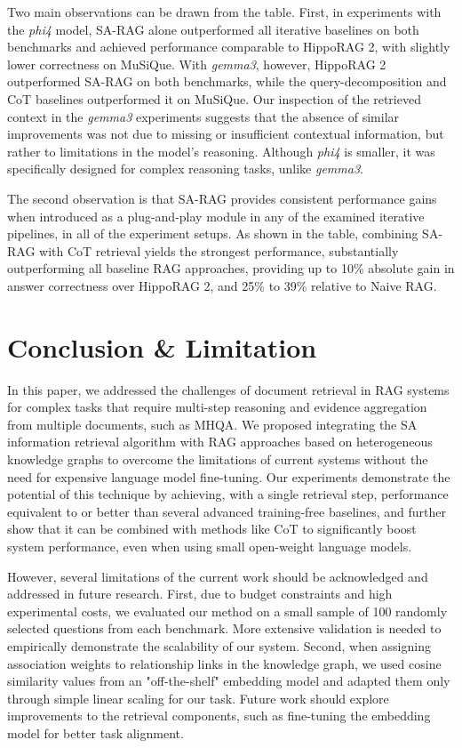 \documentclass{article}
\begin{document}
Two main observations can be drawn from the table. First, in experiments with the \textit{phi4} model, SA-RAG alone outperformed all iterative baselines on both benchmarks and achieved performance comparable to HippoRAG 2, with slightly lower correctness on MuSiQue. With \textit{gemma3}, however, HippoRAG 2 outperformed SA-RAG on both benchmarks, while the query-decomposition and CoT baselines outperformed it on MuSiQue. Our inspection of the retrieved context in the \textit{gemma3} experiments suggests that the absence of similar improvements was not due to missing or insufficient contextual information, but rather to limitations in the model’s reasoning. Although \textit{phi4} is smaller, it was specifically designed for complex reasoning tasks, unlike \textit{gemma3}. 

The second observation is that SA-RAG provides consistent performance gains when introduced as a plug-and-play module in any of the examined iterative pipelines, in all of the experiment setups. As shown in the table, combining SA-RAG with CoT retrieval yields the strongest performance, substantially outperforming all baseline RAG approaches, providing up to 10\% absolute gain in answer correctness over HippoRAG 2, and  25\% to 39\%  relative to Naive RAG.



\section{Conclusion \& Limitation}
In this paper, we addressed the challenges of document retrieval in RAG systems for complex tasks that require multi-step reasoning and evidence aggregation from multiple documents, such as MHQA. We proposed integrating the SA information retrieval algorithm with RAG approaches based on heterogeneous knowledge graphs to overcome the limitations of current systems without the need for expensive language model fine-tuning. Our experiments demonstrate the potential of this technique by achieving, with a single retrieval step, performance equivalent to or better than several advanced training-free baselines, and further show that it can be combined with methods like CoT to significantly boost system performance, even when using small open-weight language models.

However, several limitations of the current work should be acknowledged and addressed in future research. First, due to budget constraints and high experimental costs, we evaluated our method on a small sample of 100 randomly selected questions from each benchmark. More extensive validation is needed to empirically demonstrate the scalability of our system. Second, when assigning association weights to relationship links in the knowledge graph, we used cosine similarity values from an "off-the-shelf" embedding model and adapted them only through simple linear scaling for our task. Future work should explore improvements to the retrieval components, such as fine-tuning the embedding model for better task alignment.
\end{document}
